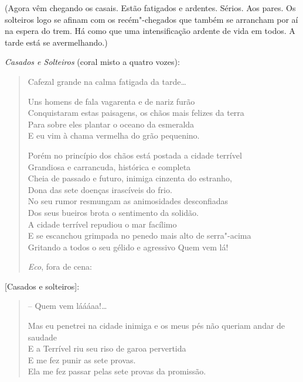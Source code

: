 {\hfill\parbox{150pt}{
(Agora vêm chegando os casais. Estão fatigados e ardentes. Sérios. Aos
pares. Os solteiros logo se afinam com os recém"-chegados que também se
arrancham por aí na espera do trem. Há como que uma intensificação
ardente de vida em todos. A tarde está se avermelhando.)
}\medskip

\emph{Casados e Solteiros} (coral misto a quatro vozes):

\begin{verse}
Cafezal grande na calma fatigada da tarde\ldots{}

Uns homens de fala vagarenta e de nariz furão\\
Conquistaram estas paisagens, os chãos mais felizes da terra\\
Para sobre eles plantar o oceano da esmeralda\\
E eu vim à chama vermelha do grão pequenino.

Porém no princípio dos chãos está postada a cidade terrível\\
Grandiosa e carrancuda, histórica e completa\\
Cheia de passado e futuro, inimiga cinzenta do estranho,\\
Dona das sete doenças irascíveis do frio.\\
No seu rumor resmungam as animosidades desconfiadas\\
Dos seus bueiros brota o sentimento da solidão.\\
A cidade terrível repudiou o mar facílimo\\
E se escanchou grimpada no penedo mais alto de serra"-acima\\
Gritando a todos o seu gélido e agressivo Quem vem lá!

\quad\quad\emph{Eco}, fora de cena:
\end{verse}

[Casados e solteiros]:

\begin{verse}
\quad\quad\quad\quad{}-- Quem vem láááaa!\ldots{}


Mas eu penetrei na cidade inimiga e os meus pés não queriam andar de saudade\\
E a Terrível riu seu riso de garoa pervertida\\
E me fez punir as sete provas.\\
Ela me fez passar pelas sete provas da promissão.


\end{verse}}
